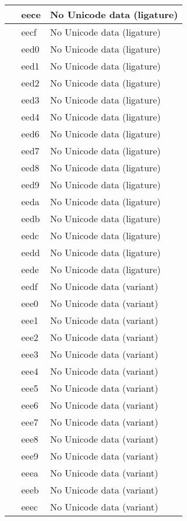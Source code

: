 \documentclass[12pt,letterpaper,openany]{book}
\begin{document}
\begin{center}
\begin{supertabular}{|m{0.25in}|m{0.5in}|m{4in}|}
			 & eece & No Unicode data (ligature)\\\hline
			 & eecf & No Unicode data (ligature)\\\hline
			 & eed0 & No Unicode data (ligature)\\\hline
			 & eed1 & No Unicode data (ligature)\\\hline
			 & eed2 & No Unicode data (ligature)\\\hline
			 & eed3 & No Unicode data (ligature)\\\hline
			 & eed4 & No Unicode data (ligature)\\\hline
			 & eed6 & No Unicode data (ligature)\\\hline
			 & eed7 & No Unicode data (ligature)\\\hline
			 & eed8 & No Unicode data (ligature)\\\hline
			 & eed9 & No Unicode data (ligature)\\\hline
			 & eeda & No Unicode data (ligature)\\\hline
			 & eedb & No Unicode data (ligature)\\\hline
			 & eedc & No Unicode data (ligature)\\\hline
			 & eedd & No Unicode data (ligature)\\\hline
			 & eede & No Unicode data (ligature)\\\hline
			 & eedf & No Unicode data (variant)\\\hline
			 & eee0 & No Unicode data (variant)\\\hline
			 & eee1 & No Unicode data (variant)\\\hline
			 & eee2 & No Unicode data (variant)\\\hline
			 & eee3 & No Unicode data (variant)\\\hline
			 & eee4 & No Unicode data (variant)\\\hline
			 & eee5 & No Unicode data (variant)\\\hline
			 & eee6 & No Unicode data (variant)\\\hline
			 & eee7 & No Unicode data (variant)\\\hline
			 & eee8 & No Unicode data (variant)\\\hline
			 & eee9 & No Unicode data (variant)\\\hline
			 & eeea & No Unicode data (variant)\\\hline
			 & eeeb & No Unicode data (variant)\\\hline
			 & eeec & No Unicode data (variant)\\\hline

\end{supertabular}
\end{center}
\end{document}
